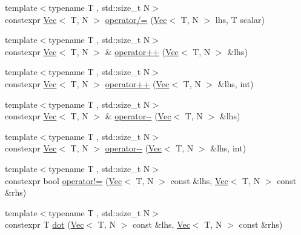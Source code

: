 \begin{DoxyCompactItemize}
\item 
{\footnotesize template$<$typename T , std\+::size\+\_\+t N$>$ }\\constexpr \mbox{\hyperlink{class_saturn_1_1_math_1_1_vec}{Vec}}$<$ T, N $>$ \mbox{\hyperlink{namespace_saturn_1_1_math_a5657fe24dc197733f92e850e43a7ca43}{operator/=}} (\mbox{\hyperlink{class_saturn_1_1_math_1_1_vec}{Vec}}$<$ T, N $>$ lhs, T scalar)
\item 
{\footnotesize template$<$typename T , std\+::size\+\_\+t N$>$ }\\constexpr \mbox{\hyperlink{class_saturn_1_1_math_1_1_vec}{Vec}}$<$ T, N $>$ \& \mbox{\hyperlink{namespace_saturn_1_1_math_a3a00dc10dd7f9474bb260f4f57d8f713}{operator++}} (\mbox{\hyperlink{class_saturn_1_1_math_1_1_vec}{Vec}}$<$ T, N $>$ \&lhs)
\item 
{\footnotesize template$<$typename T , std\+::size\+\_\+t N$>$ }\\constexpr \mbox{\hyperlink{class_saturn_1_1_math_1_1_vec}{Vec}}$<$ T, N $>$ \mbox{\hyperlink{namespace_saturn_1_1_math_a3d83f17bba6c63db1e9df10ec5915133}{operator++}} (\mbox{\hyperlink{class_saturn_1_1_math_1_1_vec}{Vec}}$<$ T, N $>$ \&lhs, int)
\item 
{\footnotesize template$<$typename T , std\+::size\+\_\+t N$>$ }\\constexpr \mbox{\hyperlink{class_saturn_1_1_math_1_1_vec}{Vec}}$<$ T, N $>$ \& \mbox{\hyperlink{namespace_saturn_1_1_math_a162d9aa139e50ae1407420a366152188}{operator-\/-\/}} (\mbox{\hyperlink{class_saturn_1_1_math_1_1_vec}{Vec}}$<$ T, N $>$ \&lhs)
\item 
{\footnotesize template$<$typename T , std\+::size\+\_\+t N$>$ }\\constexpr \mbox{\hyperlink{class_saturn_1_1_math_1_1_vec}{Vec}}$<$ T, N $>$ \mbox{\hyperlink{namespace_saturn_1_1_math_af3e23719dc49c0ddac70aa33032eb3ab}{operator-\/-\/}} (\mbox{\hyperlink{class_saturn_1_1_math_1_1_vec}{Vec}}$<$ T, N $>$ \&lhs, int)
\item 
{\footnotesize template$<$typename T , std\+::size\+\_\+t N$>$ }\\constexpr bool \mbox{\hyperlink{namespace_saturn_1_1_math_acf89a2228ab3a5066762791d741943cd}{operator!=}} (\mbox{\hyperlink{class_saturn_1_1_math_1_1_vec}{Vec}}$<$ T, N $>$ const \&lhs, \mbox{\hyperlink{class_saturn_1_1_math_1_1_vec}{Vec}}$<$ T, N $>$ const \&rhs)
\item 
{\footnotesize template$<$typename T , std\+::size\+\_\+t N$>$ }\\constexpr T \mbox{\hyperlink{namespace_saturn_1_1_math_a7c8ea659a38c4bdb2ce585c988a38c5d}{dot}} (\mbox{\hyperlink{class_saturn_1_1_math_1_1_vec}{Vec}}$<$ T, N $>$ const \&lhs, \mbox{\hyperlink{class_saturn_1_1_math_1_1_vec}{Vec}}$<$ T, N $>$ const \&rhs)

\end{DoxyCompactItemize}
